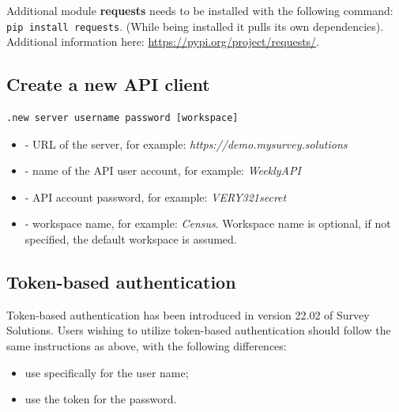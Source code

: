 Additional module \textbf{requests} needs to be installed with the following
command: \texttt{pip install requests}. (While being installed it pulls its
own dependencies). Additional information here:
\href{https://pypi.org/project/requests/}{https://pypi.org/project/requests/}.

\vskip16pt
\subsection{Create a new API client}
\begin{lstlisting}
.new server username password [workspace]
\end{lstlisting}

\paramsheader
\begin{itemize}
\item {} - URL of the server, for example: \textquotedbl\textit{https://demo.mysurvey.solutions}\textquotedbl
\item {} - name of the API user account, for example: \textquotedbl\textit{WeeklyAPI}\textquotedbl
\item {} - API account password, for example: \textquotedbl\textit{VERY321secret}\textquotedbl
\item {} - workspace name, for example: \textquotedbl\textit{Census}\textquotedbl. Workspace name is optional, if not specified, the default workspace is assumed.
\end{itemize}

\subsection{Token-based authentication}
Token-based authentication has been introduced in version 22.02 of Survey Solutions. Users wishing to utilize token-based authentication should follow the same instructions as above, with the following differences:
\begin{itemize}
  \item use specifically \textquotedbl *\textquotedbl \hspace{0.125cm} for the user name;
  \item use the token for the password.
\end{itemize}
